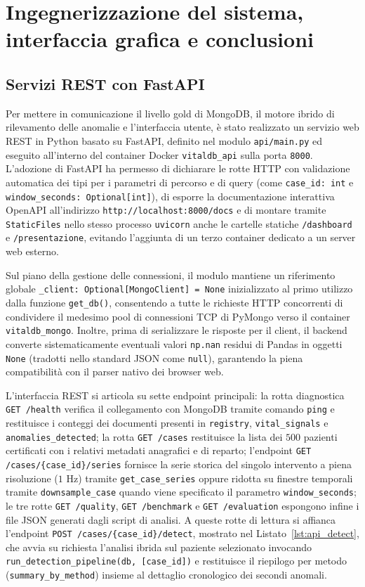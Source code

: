 \chapter{Ingegnerizzazione del sistema, interfaccia grafica e conclusioni}

\section{Servizi REST con FastAPI}
Per mettere in comunicazione il livello gold di MongoDB, il motore ibrido di rilevamento delle anomalie e l'interfaccia utente, \`e stato realizzato un servizio web REST in Python basato su FastAPI, definito nel modulo \texttt{api/main.py} ed eseguito all'interno del container Docker \texttt{vitaldb\_api} sulla porta \texttt{8000}. L'adozione di FastAPI ha permesso di dichiarare le rotte HTTP con validazione automatica dei tipi per i parametri di percorso e di query (come \texttt{case\_id: int} e \texttt{window\_seconds: Optional[int]}), di esporre la documentazione interattiva OpenAPI all'indirizzo \texttt{http://localhost:8000/docs} e di montare tramite \texttt{StaticFiles} nello stesso processo \texttt{uvicorn} anche le cartelle statiche \texttt{/dashboard} e \texttt{/presentazione}, evitando l'aggiunta di un terzo container dedicato a un server web esterno.

Sul piano della gestione delle connessioni, il modulo mantiene un riferimento globale \texttt{\_client: Optional[MongoClient] = None} inizializzato al primo utilizzo dalla funzione \texttt{get\_db()}, consentendo a tutte le richieste HTTP concorrenti di condividere il medesimo pool di connessioni TCP di PyMongo verso il container \texttt{vitaldb\_mongo}. Inoltre, prima di serializzare le risposte per il client, il backend converte sistematicamente eventuali valori \texttt{np.nan} residui di Pandas in oggetti \texttt{None} (tradotti nello standard JSON come \texttt{null}), garantendo la piena compatibilit\`a con il parser nativo dei browser web.

L'interfaccia REST si articola su sette endpoint principali: la rotta diagnostica \texttt{GET /health} verifica il collegamento con MongoDB tramite comando \texttt{ping} e restituisce i conteggi dei documenti presenti in \texttt{registry}, \texttt{vital\_signals} e \texttt{anomalies\_detected}; la rotta \texttt{GET /cases} restituisce la lista dei $500$ pazienti certificati con i relativi metadati anagrafici e di reparto; l'endpoint \texttt{GET /cases/\{case\_id\}/series} fornisce la serie storica del singolo intervento a piena risoluzione ($1\text{ Hz}$) tramite \texttt{get\_case\_series} oppure ridotta su finestre temporali tramite \texttt{downsample\_case} quando viene specificato il parametro \texttt{window\_seconds}; le tre rotte \texttt{GET /quality}, \texttt{GET /benchmark} e \texttt{GET /evaluation} espongono infine i file JSON generati dagli script di analisi. A queste rotte di lettura si affianca l'endpoint \texttt{POST /cases/\{case\_id\}/detect}, mostrato nel Listato~\ref{lst:api_detect}, che avvia su richiesta l'analisi ibrida sul paziente selezionato invocando \texttt{run\_detection\_pipeline(db, [case\_id])} e restituisce il riepilogo per metodo (\texttt{summary\_by\_method}) insieme al dettaglio cronologico dei secondi anomali.
\FloatBarrier

